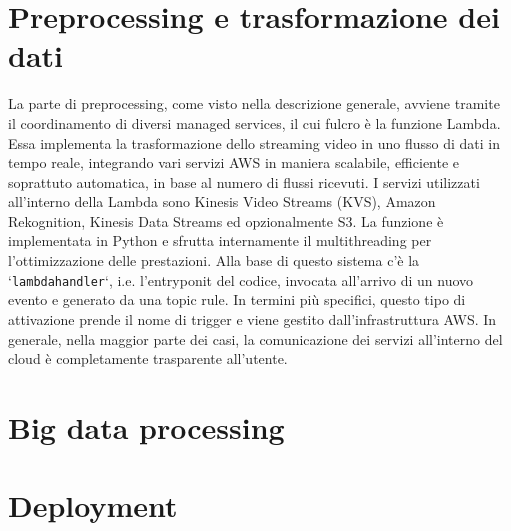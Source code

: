 \section{Preprocessing e trasformazione dei dati}
La parte di preprocessing, come visto nella descrizione generale, avviene tramite il coordinamento di diversi managed services, il cui fulcro è la funzione Lambda. Essa implementa la trasformazione dello streaming video in uno flusso di dati in tempo reale, integrando vari servizi AWS in maniera scalabile, efficiente e soprattuto automatica, in base al numero di flussi ricevuti. I servizi utilizzati all'interno della Lambda sono Kinesis Video Streams (KVS), Amazon Rekognition, Kinesis Data Streams ed opzionalmente S3. La funzione è implementata in Python e sfrutta internamente il multithreading per l'ottimizzazione delle prestazioni. Alla base di questo sistema c'è la `\texttt{lambda\textunderscore handler}`, i.e. l'entryponit del codice, invocata all’arrivo di un nuovo evento e generato da una topic rule. In termini più specifici, questo tipo di attivazione prende il nome di trigger e viene gestito dall'infrastruttura AWS. In generale, nella maggior parte dei casi, la comunicazione dei servizi all'interno del cloud è completamente trasparente all'utente.  

\section{Big data processing}
\section{Deployment}